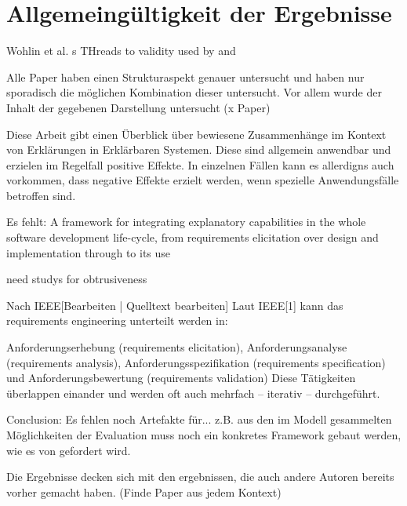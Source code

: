 \section{Allgemeingültigkeit der Ergebnisse}

Wohlin et al. s THreads to validity \cite{wohlin2012experimentation} used by \cite{ghazi2016exploratory} and \cite{carvalho2020developers}

Alle Paper haben einen Strukturaspekt genauer untersucht und haben nur sporadisch die möglichen Kombination dieser untersucht. Vor allem wurde der Inhalt der gegebenen Darstellung untersucht (x Paper)

Diese Arbeit gibt einen Überblick über bewiesene Zusammenhänge im Kontext von Erklärungen in Erklärbaren Systemen. Diese sind allgemein anwendbar und erzielen im Regelfall positive Effekte. In einzelnen Fällen kann es allerdigns auch vorkommen, dass negative Effekte erzielt werden, wenn spezielle Anwendungsfälle betroffen sind.

Es fehlt: A framework for integrating explanatory capabilities in the whole software development life-cycle, from requirements elicitation over design and implementation through to its use \cite{cassens_ambient_2019}

need studys for obtrusiveness \cite{lim_2009_assessing}

Nach IEEE[Bearbeiten | Quelltext bearbeiten]
Laut IEEE[1] kann das requirements engineering unterteilt werden in:

Anforderungserhebung (requirements elicitation),
Anforderungsanalyse (requirements analysis),
Anforderungsspezifikation (requirements specification) und
Anforderungsbewertung (requirements validation)
Diese Tätigkeiten überlappen einander und werden oft auch mehrfach – iterativ – durchgeführt.

Conclusion: Es fehlen noch Artefakte für... z.B. aus den im Modell gesammelten Möglichkeiten der Evaluation muss noch ein konkretes Framework gebaut werden, wie es von \citeauthor{sokol_explainability_2020} gefordert wird.

Die Ergebnisse decken sich mit den ergebnissen, die auch andere Autoren bereits vorher gemacht haben. (Finde Paper aus jedem Kontext)

\newpage